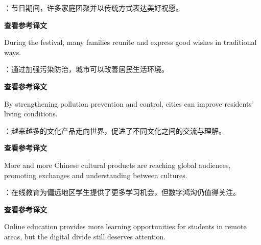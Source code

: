 \documentclass[a4paper,11pt,UTF8,fontset=none]{ctexart}
\begin{document}
\vspace{4pt}

：节日期间，许多家庭团聚并以传统方式表达美好祝愿。\par

\noindent\colorbox{HeadBlue}{\strut {\bfseries 查看参考译文}}\par\vspace{1pt}

\noindent During the festival, many families reunite and express good wishes in traditional ways.\par

\vspace{4pt}

：通过加强污染防治，城市可以改善居民生活环境。\par

\noindent\colorbox{HeadBlue}{\strut {\bfseries 查看参考译文}}\par\vspace{1pt}

\noindent By strengthening pollution prevention and control, cities can improve residents’ living conditions.\par

\vspace{4pt}

：越来越多的文化产品走向世界，促进了不同文化之间的交流与理解。\par

\noindent\colorbox{HeadBlue}{\strut {\bfseries 查看参考译文}}\par\vspace{1pt}

\noindent More and more Chinese cultural products are reaching global audiences, promoting exchanges and understanding between cultures.\par

\vspace{4pt}

：在线教育为偏远地区学生提供了更多学习机会，但数字鸿沟仍值得关注。\par

\noindent\colorbox{HeadBlue}{\strut {\bfseries 查看参考译文}}\par\vspace{1pt}

\noindent Online education provides more learning opportunities for students in remote areas, but the digital divide still deserves attention.\par
\end{document}
